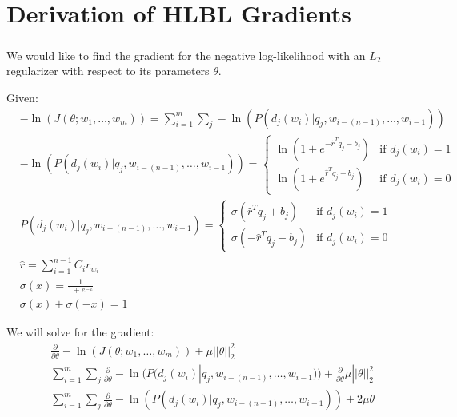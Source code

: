 
\chapter{Derivation of HLBL Gradients}
\paragraph{}
We would like to find the gradient for the negative log-likelihood with an $L_2$ regularizer with respect to its parameters $\theta$.

Given:
\begin{align*}
&-\ln(J(\theta;w_1,\dots, w_m)) = \sum_{i=1}^{m} \sum_j -\ln(P(d_j(w_i) | q_j, w_{i-(n-1)},\dots, w_{i-1}))
\\ 
&-\ln(P(d_j(w_i) | q_j, w_{i-(n-1)},\dots, w_{i-1})) =  
\begin{cases}
  \ln (1 + e^{-\hat{r}^T q_{j} -b_{j}}) & \text{if } d_j(w_i)  = 1 \\
  \ln (1 + e^{\hat{r}^T q_{j} +b_{j}})     & \text{if } d_j(w_i) = 0
  \end{cases}
\\
&P(d_j(w_i) | q_j, w_{i-(n-1)},\dots, w_{i-1}) =  
\begin{cases}
  \sigma(\hat{r}^T q_{j} +b_{j}) & \text{if } d_j(w_i)  = 1 \\
  \sigma(-\hat{r}^T q_{j} -b_{j})     & \text{if } d_j(w_i) = 0
  \end{cases}
\\
&\hat{r} = \sum_{i=1}^{n-1} C_i r_{w_i} 
\\
&\sigma(x) = \frac{1}{1+e^{-x}}
\\
&\sigma(x) +\sigma(-x) = 1
\end{align*}

We will solve for the gradient:
\begin{align*}
&\frac{\partial}{\partial \theta} -\ln(J(\theta;w_1,\dots, w_m)) +  \mu ||\theta||^2_2
\\
& \sum_{i=1}^{m} \sum_j \frac{\partial}{\partial \theta} -\ln(P(d_j(w_i) | q_j, w_{i-(n-1)},\dots, w_{i-1})) +\frac{\partial}{\partial \theta}  \mu ||\theta||^2_2
\\
& \sum_{i=1}^{m} \sum_j \frac{\partial}{\partial \theta} -\ln(P(d_j(w_i) | q_j, w_{i-(n-1)},\dots, w_{i-1})) + 2 \mu \theta
\end{align*}

